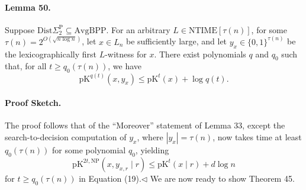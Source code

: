 \paragraph{Lemma 50.} Suppose $\mathrm{Dist}\Sigma_2^{\mathrm P}\subseteq\mathrm{AvgBPP}$. For an arbitrary $L\in\mathrm{NTIME}[\tau(n)]$, for some $\tau(n)=2^{O(\sqrt{n\log n})}$, let $x\in L_n$ be sufficiently large, and let $y_x\in\{0,1\}^{\tau(n)}$ be the lexicographically first $L$-witness for $x$. There exist polynomials $q$ and $q_0$ such that, for all $t\geq q_0(\tau(n))$, we have
\[\mathrm{pK}^{q(t)}(x,y_x)\leq\mathrm{pK}^t(x)+\log q(t).\]
\paragraph{Proof Sketch.} The proof follows that of the ``Moreover'' statement of Lemma 33, except the search-to-decision computation of $y_x$, where $|y_x|=\tau(n)$, now takes time at least $q_0(\tau(n))$ for some polynomial $q_0$, yielding
\[\mathrm{pK}^{2t,\mathrm{NP}}(x,y_{x,r}\mid r)\leq\mathrm{pK}^t(x\mid r)+d\log n\]
for $t\geq q_0(\tau(n))$ in Equation (19).\hfill$\triangleleft$
We are now ready to show Theorem 45.
